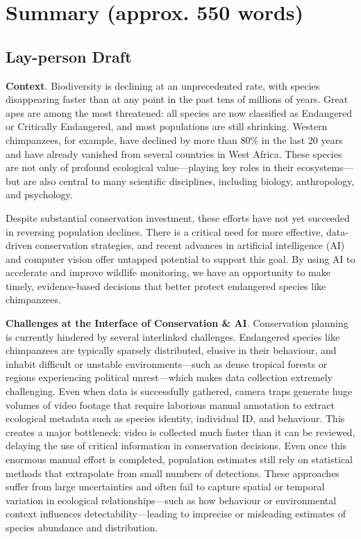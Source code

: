 \section*{Summary (approx. 550 words)}

\subsection*{Lay-person Draft}

\textbf{Context}. Biodiversity is declining at an unprecedented rate, with species disappearing faster than at any point in the past tens of millions of years. Great apes are among the most threatened: all species are now classified as Endangered or Critically Endangered, and most populations are still shrinking. Western chimpanzees, for example, have declined by more than 80\% in the last 20 years and have already vanished from several countries in West Africa. These species are not only of profound ecological value—playing key roles in their ecosystems—but are also central to many scientific disciplines, including biology, anthropology, and psychology.

Despite substantial conservation investment, these efforts have not yet succeeded in reversing population declines. There is a critical need for more effective, data-driven conservation strategies, and recent advances in artificial intelligence (AI) and computer vision offer untapped potential to support this goal. By using AI to accelerate and improve wildlife monitoring, we have an opportunity to make timely, evidence-based decisions that better protect endangered species like chimpanzees.

\textbf{Challenges at the Interface of Conservation \& AI}. Conservation planning is currently hindered by several interlinked challenges. Endangered species like chimpanzees are typically sparsely distributed, elusive in their behaviour, and inhabit difficult or unstable environments—such as dense tropical forests or regions experiencing political unrest—which makes data collection extremely challenging. Even when data is successfully gathered, camera traps generate huge volumes of video footage that require laborious manual annotation to extract ecological metadata such as species identity, individual ID, and behaviour. This creates a major bottleneck: video is collected much faster than it can be reviewed, delaying the use of critical information in conservation decisions. Even once this enormous manual effort is completed, population estimates still rely on statistical methods that extrapolate from small numbers of detections. These approaches suffer from large uncertainties and often fail to capture spatial or temporal variation in ecological relationships—such as how behaviour or environmental context influences detectability—leading to imprecise or misleading estimates of species abundance and distribution.

